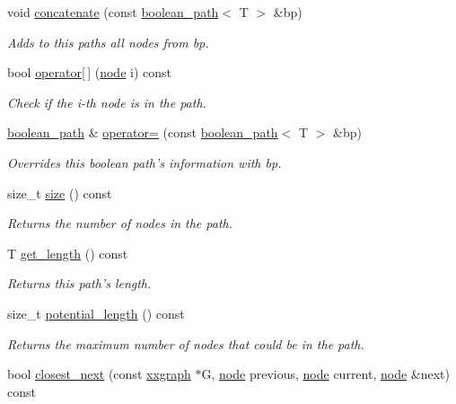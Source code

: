 \begin{DoxyCompactItemize}
void \hyperlink{classlgraph_1_1boolean__path_ad2a4186c5836ac554fefeace9b9d775f}{concatenate} (const \hyperlink{classlgraph_1_1boolean__path}{boolean\-\_\-path}$<$ T $>$ \&bp)
\begin{DoxyCompactList}\small\item\em Adds to this paths all nodes from bp. \end{DoxyCompactList}\item 
bool \hyperlink{classlgraph_1_1boolean__path_aa6dbbaa758c5f0669aba45e2b43c1f49}{operator\mbox{[}$\,$\mbox{]}} (\hyperlink{namespacelgraph_a397169dd66adf725210a30fb7251773e}{node} i) const 
\begin{DoxyCompactList}\small\item\em Check if the i-\/th node is in the path. \end{DoxyCompactList}\item 
\hyperlink{classlgraph_1_1boolean__path}{boolean\-\_\-path} \& \hyperlink{classlgraph_1_1boolean__path_a72f36b5460f82b2922cec385db08c967}{operator=} (const \hyperlink{classlgraph_1_1boolean__path}{boolean\-\_\-path}$<$ T $>$ \&bp)
\begin{DoxyCompactList}\small\item\em Overrides this boolean path's information with {\itshape bp}. \end{DoxyCompactList}\item 
size\-\_\-t \hyperlink{classlgraph_1_1boolean__path_aa14dc868cb4055a4fa31b8223d41a9e5}{size} () const 
\begin{DoxyCompactList}\small\item\em Returns the number of nodes in the path. \end{DoxyCompactList}\item 
T \hyperlink{classlgraph_1_1boolean__path_a5e8536fbd958d6b4b2dced0e05dfc97f}{get\-\_\-length} () const 
\begin{DoxyCompactList}\small\item\em Returns this path's length. \end{DoxyCompactList}\item 
size\-\_\-t \hyperlink{classlgraph_1_1boolean__path_ae75e241e99a66c8dbfa328700bb2cdbc}{potential\-\_\-length} () const 
\begin{DoxyCompactList}\small\item\em Returns the maximum number of nodes that could be in the path. \end{DoxyCompactList}\item 
bool \hyperlink{classlgraph_1_1boolean__path_ac802abcf4a728123cfb4d7a53f109908}{closest\-\_\-next} (const \hyperlink{classlgraph_1_1xxgraph}{xxgraph} $\ast$G, \hyperlink{namespacelgraph_a397169dd66adf725210a30fb7251773e}{node} previous, \hyperlink{namespacelgraph_a397169dd66adf725210a30fb7251773e}{node} current, \hyperlink{namespacelgraph_a397169dd66adf725210a30fb7251773e}{node} \&next) const 

\end{DoxyCompactItemize}
